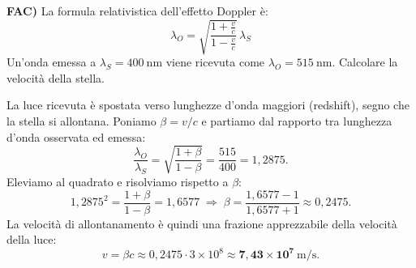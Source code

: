 \begin{question}[ID=fac, subtitle={Effetto Doppler relativistico — velocità di una stella}, tags={onde, effetto doppler, relatività}, difficulty=difficile]
\textbf{FAC)} La formula relativistica dell'effetto Doppler è:
\[
\lambda_O = \sqrt{\frac{1+\frac{v}{c}}{1-\frac{v}{c}}}\,\lambda_S
\]
Un'onda emessa a $\lambda_S = 400\ \mathrm{nm}$ viene ricevuta come $\lambda_O = 515\ \mathrm{nm}$. Calcolare la velocità della stella.
\begin{solution}
La luce ricevuta è spostata verso lunghezze d'onda maggiori (redshift), segno che la stella si allontana. Poniamo $\beta = v/c$ e partiamo dal rapporto tra lunghezza d'onda osservata ed emessa:
\[
\frac{\lambda_O}{\lambda_S} = \sqrt{\frac{1+\beta}{1-\beta}} = \frac{515}{400} = 1{,}2875.
\]
Eleviamo al quadrato e risolviamo rispetto a $\beta$:
\[
1{,}2875^2 = \frac{1+\beta}{1-\beta} = 1{,}6577 \;\Rightarrow\; \beta = \frac{1{,}6577-1}{1{,}6577+1} \approx 0{,}2475.
\]
La velocità di allontanamento è quindi una frazione apprezzabile della velocità della luce:
\[
v = \beta c \approx 0{,}2475\cdot 3\times10^8 \approx \mathbf{7{,}43\times10^7\ \mathrm{m/s}}.
\]
\end{solution}
\end{question}
